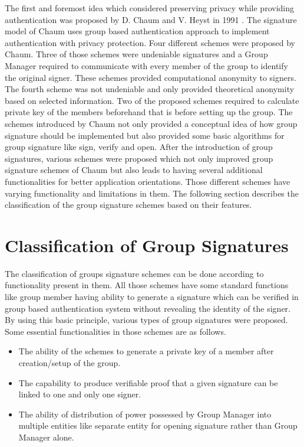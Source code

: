 The first and foremost idea which considered preserving privacy while providing authentication was proposed by D. Chaum and V. Heyst in 1991 \cite{chaum1991group}. The signature model of Chaum uses group based authentication approach to implement authentication with privacy protection. Four different schemes were proposed by Chaum. Three of those schemes were undeniable signatures and a Group Manager required to communicate with every member of the group to identify the original signer. These schemes provided computational anonymity to signers. The fourth scheme was not undeniable and only provided theoretical anonymity based on selected information. Two of the proposed schemes required to calculate private key of the members beforehand that is before setting up the group. The schemes introduced by Chaum not only provided a conceptual idea of how group signature should be implemented but also provided some basic algorithms for group signature like sign, verify and open. After the introduction of group signatures, various schemes were proposed which not only improved group signature schemes of Chaum but also leads to having several additional functionalities for better application orientations. Those different schemes have varying functionality and limitations in them. The following section describes the classification of the group signature schemes based on their features.

\section{Classification of Group Signatures}\label{ClassificationGroupSignatures}
The classification of groups signature schemes can be done according to functionality present in them. All those schemes have some standard functions like group member having ability to generate a signature which can be verified in group based authentication system without revealing the identity of the signer. By using this basic principle, various types of group signatures were proposed. Some essential functionalities in those schemes are as follows.
\begin{itemize}
\item The ability of the schemes to generate a private key of a member after creation/setup of the group.
\item The capability to produce verifiable proof that a given signature can be linked to one and only one signer.
\item The ability of distribution of power possessed by Group Manager into multiple entities like separate entity for opening signature rather than Group Manager alone.
\end{itemize}

